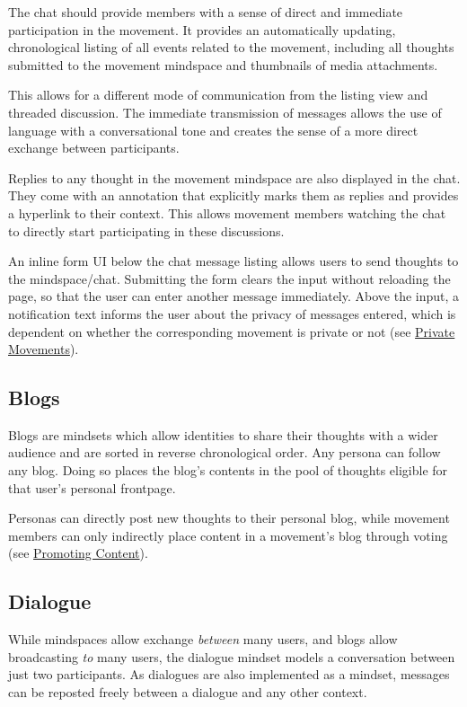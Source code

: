 The chat should provide members with a sense of direct and immediate
participation in the movement. It provides an automatically updating,
chronological listing of all events related to the movement, including
all thoughts submitted to the movement mindspace and thumbnails of media
attachments.

This allows for a different mode of communication from the listing view
and threaded discussion. The immediate transmission of messages allows
the use of language with a conversational tone and creates the sense of
a more direct exchange between participants.

Replies to any thought in the movement mindspace are also displayed in
the chat. They come with an annotation that explicitly marks them as
replies and provides a hyperlink to their context. This allows movement
members watching the chat to directly start participating in these
discussions.

An inline form UI below the chat message listing allows users to send
thoughts to the mindspace/chat. Submitting the form clears the input
without reloading the page, so that the user can enter another message
immediately. Above the input, a notification text informs the user about
the privacy of messages entered, which is dependent on whether the
corresponding movement is private or not (see
\hyperref[private-movements]{Private Movements}).

\subsection{Blogs}\label{blogs}

Blogs are mindsets which allow identities to share their thoughts with a
wider audience and are sorted in reverse chronological order. Any
persona can follow any blog. Doing so places the blog's contents in the
pool of thoughts eligible for that user's personal frontpage.

Personas can directly post new thoughts to their personal blog, while
movement members can only indirectly place content in a movement's blog
through voting (see \hyperref[promoting-content]{Promoting Content}).

\subsection{Dialogue}\label{dialogue}

While mindspaces allow exchange \emph{between} many users, and blogs
allow broadcasting \emph{to} many users, the dialogue mindset models a
conversation between just two participants. As dialogues are also
implemented as a mindset, messages can be reposted freely between a
dialogue and any other context.

